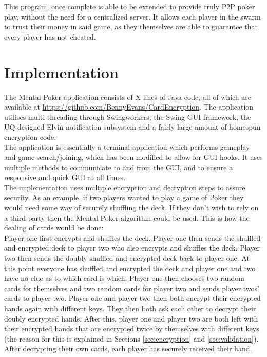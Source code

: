\documentclass[11pt, oneside]{article}   	%
\begin{document}
This program, once complete is able to be extended to provide truly P2P poker play, without the need for a centralized server. It allows each player in the swarm to trust their money in said game, as they themselves are able to guarantee that every player has not cheated.

\section{Implementation}

The Mental Poker application consists of X lines of Java code, all of which are available at \url{https://github.com/BennyEvans/CardEncryption}. The application utilises multi-threading through Swingworkers, the Swing GUI framework, the UQ-designed Elvin notification subsystem and a fairly large amount of homespun encryption code.\\  The application is essentially a terminal application which performs gameplay and game search/joining, which has been modified to allow for GUI hooks. It uses multiple methods to communicate to and from the GUI, and to ensure a responsive and quick GUI at all times.\\

The implementation uses multiple encryption and decryption steps to assure security. As an example, if two players wanted to play a game of Poker they would need some way of securely shuffling the deck. If they don't wish to rely on a third party then the Mental Poker algorithm could be used. This is how the dealing of cards would be done:\\

Player one first encrypts and shuffles the deck. Player one then sends the shuffled and encrypted deck to player two who also encrypts and shuffles the deck. Player two then sends the doubly shuffled and encrypted deck back to player one. At this point everyone has shuffled and encrypted the deck and player one and two have no clue as to which card is which. Player one then chooses two random cards for themselves and two random cards for player two and sends player twos’ cards  to player two. Player one and player two then both encrypt their encrypted hands again with different keys. They then both ask each other to decrypt their doubly encrypted hands. After this, player one and player two are both left with their encrypted hands that are encrypted twice by themselves with different keys (the reason for this is explained in Sections \ref{sec:encryption} and \ref{sec:validation}). After decrypting their own cards, each player has securely received their hand.
\end{document}
